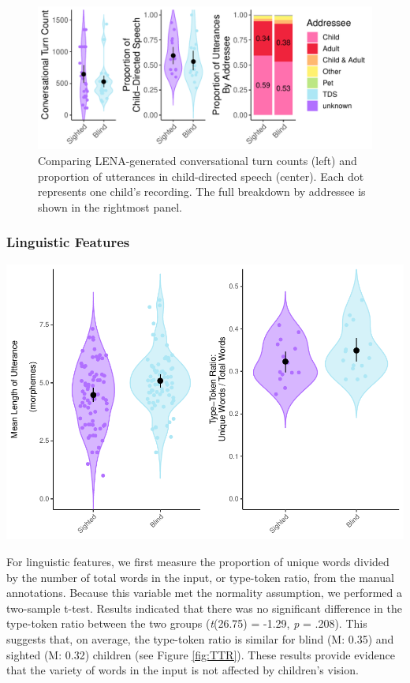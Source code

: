 \documentclass[
  man,floatsintext]{apa6}
\begin{document}
\begin{figure}
\centering
\includegraphics{input_quality_manuscript_files/figure-latex/interactiveness-plots-1.pdf}
\caption{\label{fig:interactiveness-plots}Comparing LENA-generated conversational turn counts (left) and proportion of utterances in child-directed speech (center). Each dot represents one child's recording. The full breakdown by addressee is shown in the rightmost panel.}
\end{figure}

\hypertarget{linguistic-features}{%
\subsubsection{Linguistic Features}\label{linguistic-features}}

\includegraphics{input_quality_manuscript_files/figure-latex/linguistic-plots-1.pdf}

For linguistic features, we first measure the proportion of unique words divided by the number of total words in the input, or type-token ratio, from the manual annotations. Because this variable met the normality assumption, we performed a two-sample t-test. Results indicated that there was no significant difference in the type-token ratio between the two groups (\emph{t}(26.75) = -1.29, \emph{p} = .208). This suggests that, on average, the type-token ratio is similar for blind (M: 0.35) and sighted (M: 0.32) children (see Figure \ref{fig:TTR}). These results provide evidence that the variety of words in the input is not affected by children's vision.
\end{document}
